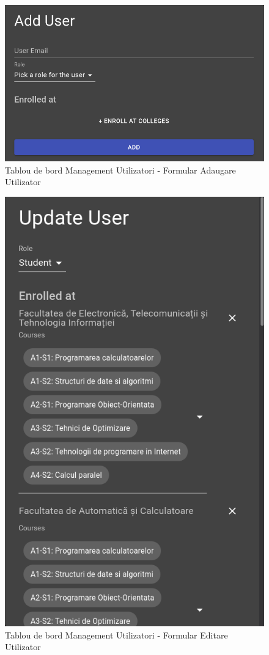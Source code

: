 \documentclass[12pt, a4paper, oneside, romanian]{teza-upb}
\begin{document}
\begin{figure}[H]
\centering
\includegraphics*[width=0.7\columnwidth]{tablou-de-bord-management-utilizatori-formular-adaugare-utilizator}
\caption{Tablou de bord Management Utilizatori - Formular Adaugare Utilizator}
\label{tablou-de-bord-management-utilizatori-formular-adaugare-utilizator}
\end{figure}

\begin{figure}[H]
\centering
\includegraphics*[width=0.65\columnwidth]{tablou-de-bord-management-utilizatori-formular-editare-utilizator}
\caption{Tablou de bord Management Utilizatori - Formular Editare Utilizator}
\label{tablou-de-bord-management-utilizatori-formular-editare-utilizator}
\end{figure}
\end{document}
